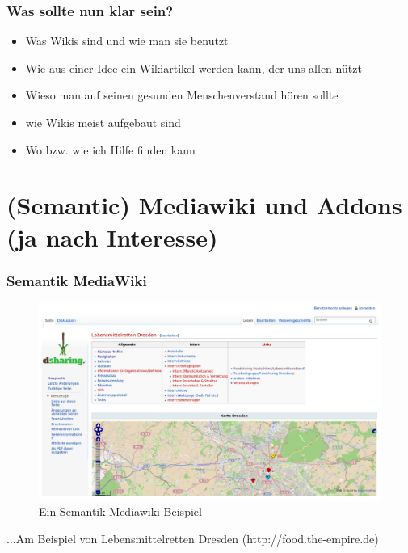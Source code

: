 \documentclass[handout]{beamer}   %
\begin{document}
  
\begin{frame}
  \frametitle{Was sollte nun klar sein?}
  \begin{itemize}[<+->]
    \item Was Wikis sind und wie man sie benutzt
    \item Wie aus einer Idee ein Wikiartikel werden kann, der uns allen nützt
    \item Wieso man auf seinen gesunden Menschenverstand hören sollte
    \item wie Wikis meist aufgebaut sind
    \item Wo bzw. wie ich Hilfe finden kann
  \end{itemize}
\end{frame}

\section{(Semantic) Mediawiki und Addons (ja nach Interesse)}

\begin{frame}
  \frametitle{Semantik MediaWiki}

	\begin{figure}[tbph]
		\centering
		\includegraphics[width=\linewidth]{Lebensmittelretten-Dresden_Landkarte_mit_Seitenleisten}
		\caption[Ein Semantik-Mediawiki-Beispiel]{Ein Semantik-Mediawiki-Beispiel}
		\label{fig:Lebensmittelretten-Dresden_Landkarte_mit_Seitenleisten}
	\end{figure}

  ...Am Beispiel von Lebensmittelretten Dresden (http://food.the-empire.de)
\end{frame}
  
%
%
\end{document}
